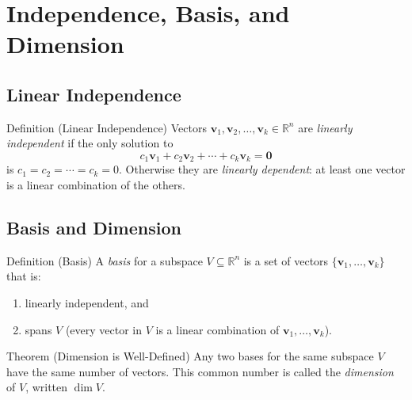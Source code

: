 
\section{Independence, Basis, and Dimension}

\subsection*{Linear Independence}

\begin{propositionbox}{Definition (Linear Independence)}
Vectors $\mathbf{v}_1, \mathbf{v}_2, \ldots, \mathbf{v}_k \in \mathbb{R}^n$ are
\emph{linearly independent} if the only solution to
\[
  c_1\mathbf{v}_1 + c_2\mathbf{v}_2 + \cdots + c_k\mathbf{v}_k = \mathbf{0}
\]
is $c_1 = c_2 = \cdots = c_k = 0$.
Otherwise they are \emph{linearly dependent}: at least one vector is
a linear combination of the others.
\end{propositionbox}

\subsection*{Basis and Dimension}

\begin{propositionbox}{Definition (Basis)}
A \emph{basis} for a subspace $V \subseteq \mathbb{R}^n$ is a set of vectors
$\{\mathbf{v}_1, \ldots, \mathbf{v}_k\}$ that is:
\begin{enumerate}
  \item linearly independent, and
  \item spans $V$ (every vector in $V$ is a linear combination of $\mathbf{v}_1,\ldots,\mathbf{v}_k$).
\end{enumerate}
\end{propositionbox}

\begin{theorembox}{Theorem (Dimension is Well-Defined)}
Any two bases for the same subspace $V$ have the same number of vectors.
This common number is called the \emph{dimension} of $V$, written $\dim V$.
\end{theorembox}

